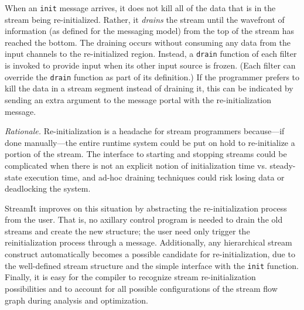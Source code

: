 When an \texttt{init} message arrives, it does not kill all of the
data that is in the stream being re-initialized.  Rather, it
\emph{drains} the stream until the wavefront of information (as
defined for the messaging model) from the top of the stream has
reached the bottom.  The draining occurs without consuming any data
from the input channels to the re-initialized region.  Instead, a
\texttt{drain} function of each filter is invoked to provide input
when its other input source is frozen.  (Each filter can override the
\texttt{drain} function as part of its definition.)  If the programmer
prefers to kill the data in a stream segment instead of draining it,
this can be indicated by sending an extra argument to the message
portal with the re-initialization message.

\emph{Rationale.}  Re-initialization is a headache for stream
programmers because---if done manually---the entire runtime system could
be put on hold to re-initialize a portion of the stream.  The
interface to starting and stopping streams could be complicated when
there is not an explicit notion of initialization time vs.
steady-state execution time, and ad-hoc draining techniques could risk
losing data or deadlocking the system.

StreamIt improves on this situation by abstracting the
re-initialization process from the user.  That is, no axillary
control program is needed to drain the old streams and create the new
structure; the user need only trigger the reinitialization process
through a message.  Additionally, any hierarchical stream construct
automatically becomes a possible candidate for re-initialization, due
to the well-defined stream structure and the simple interface with the
\texttt{init} function.  Finally, it is easy for the compiler to
recognize stream re-initialization possibilities and to account for
all possible configurations of the stream flow graph during analysis
and optimization.


